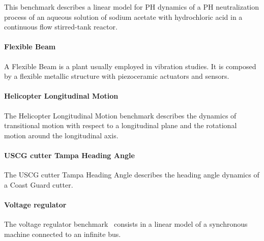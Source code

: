 \documentclass[twocolumn]{autart}    %
\begin{document}
This benchmark describes a linear model for PH dynamics of a PH 
neutralization process of an aqueous solution of sodium acetate with 
hydrochloric acid in a continuous flow stirred-tank reactor.

\paragraph*{Flexible Beam}

A Flexible Beam is a plant usually employed in vibration studies. It is 
composed by a flexible metallic structure with piezoceramic actuators 
and sensors.

\paragraph*{Helicopter Longitudinal Motion}

The Helicopter Longitudinal Motion benchmark describes the dynamics of 
transitional motion with respect to a longitudinal plane and the 
rotational motion around the longitudinal axis.

\paragraph*{USCG cutter Tampa Heading Angle}

The USCG cutter Tampa Heading Angle describes the heading angle 
dynamics of a Coast Guard cutter.

\paragraph*{Voltage regulator}

The voltage regulator benchmark~\cite{KOKOTOVIC198023} consists 
in a linear model of a synchronous machine connected to an 
infinite bus.
\end{document}
